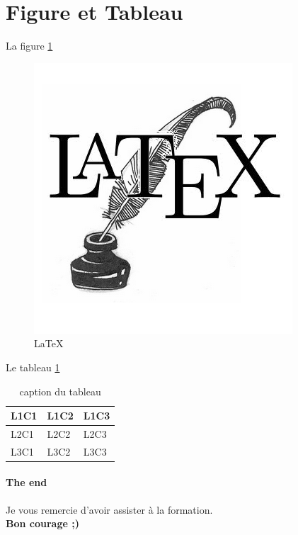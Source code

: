\documentclass[a4paper,12pt]{report}
\begin{document}
\section{Figure et Tableau}
La figure \ref{info pour se referer}
\begin{figure}[h]
\centering
\includegraphics[scale= 0.5]{LatexLogo}
\caption{LaTeX}  
\label{info pour se referer} 
\end{figure} 

Le tableau \ref{abc}
\begin{table}[h]
\centering
\begin{tabular}{| l | l | l |}
\hline
L1C1 & L1C2 & L1C3 \\
\hline
L2C1 & L2C2 & L2C3 \\
\hline
L3C1 & L3C2 & L3C3 \\
\hline
\end{tabular}
\caption{caption du tableau}
\label{abc}
\end{table}
\paragraph{The end}
\begin{center}
Je vous remercie d'avoir assister à la formation.\\ %
\large{\textbf{Bon courage ;)}} %
\end{center} %
\end{document}

